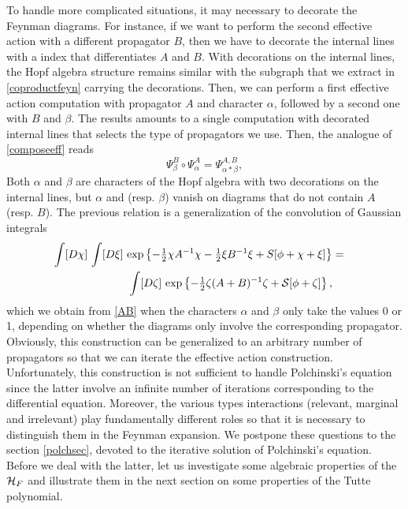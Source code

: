 \documentclass[12pt,here,feynmf]{article}
\begin{document}
To handle more complicated situations, it may necessary to decorate the Feynman diagrams. For instance, if we want to perform the second effective action with a different propagator $B$, then we have to decorate the internal lines with a index that differentiates $A$ and $B$. With decorations on the internal lines, the Hopf algebra structure remains similar with the subgraph that we extract in \eqref{coproductfeyn} carrying the decorations. Then, we can perform a first effective action computation with propagator $A$ and character $\alpha$, followed by a second one with $B$ and $\beta$. The results amounts to a single computation with decorated internal lines that selects the type of propagators we use. Then, the analogue of \eqref{composeeff} reads
\begin{equation}
\Psi_{\beta}^{B}\circ\Psi_{\alpha}^{A}=\Psi_{\alpha\ast\beta}^{A,B}\label{AB},
\end{equation}
Both $\alpha$ and $\beta$ are characters of the Hopf algebra with two decorations on the internal lines, but $\alpha$ and (resp. $\beta$) vanish on diagrams that do not contain $A$ (resp. $B$). The previous relation is a generalization of the convolution of Gaussian integrals
\begin{eqnarray}
\int[D\chi]\,\int[D\xi]\,
\exp\left\{-{\textstyle\frac{1}{2}}\chi A^{-1}\chi-{\textstyle \frac{1}{2}}\xi B^{-1}\xi+\-S[\phi+\chi+\xi]\right\}&=&\cr
\int[D\zeta]\,\exp\left\{-{\textstyle\frac{1}{2}}\zeta(A+B)^{-1}\zeta+{\cal
S}[\phi+\zeta]\right\},&&
\end{eqnarray}
which we obtain from \eqref{AB} when the characters $\alpha$ and $\beta$ only take the values 0 or 1, depending on whether the diagrams only involve the corresponding propagator. Obviously, this construction can be generalized to an arbitrary number of propagators so that we can iterate the effective action construction. Unfortunately, this construction is not sufficient to handle Polchinski's equation since the latter involve an infinite number of iterations corresponding to the differential equation. Moreover, the various types interactions (relevant, marginal and irrelevant) play fundamentally different roles so that it is necessary to distinguish them in the Feynman expansion. We postpone these questions to the section \ref{polchsec}, devoted to the iterative solution of Polchinski's equation.  Before we deal with the latter, let us  investigate some algebraic properties of the ${\cal H}_{F}$ and illustrate them in the next section on some properties of the Tutte polynomial.
 
\end{document}
